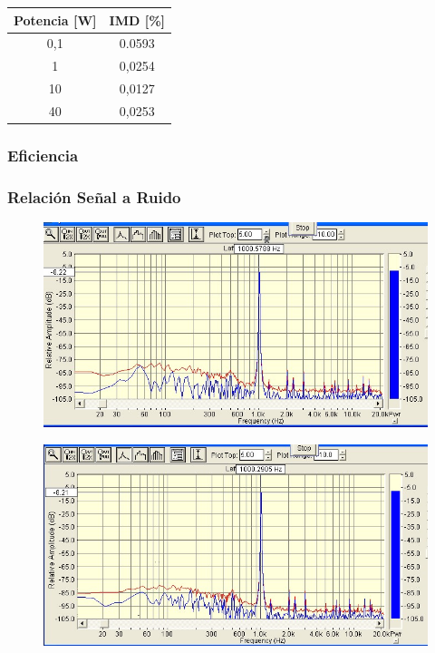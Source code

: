 			\begin{table}
				\begin{tabular}{cc}
				\toprule
				Potencia [W] & IMD [\%]\\
				\midrule
				0,1 & 0.0593 \\
				1 & 0,0254 \\
				10 & 0,0127 \\
				40 & 0,0253 \\
				\bottomrule
				\end{tabular}
			\end{table}

		\subsubsection{Eficiencia}

		\subsubsection{Relación Señal a Ruido}
			\begin{figure}[H]
				\centering
				\includegraphics[scale=0.3]{./Figuras/SNR_1K_1W.jpg}
			\end{figure}

			\begin{figure}[H]
				\centering
				\includegraphics[scale=0.3]{./Figuras/SNR_1K_1W_imagen2.jpg}
			\end{figure}

